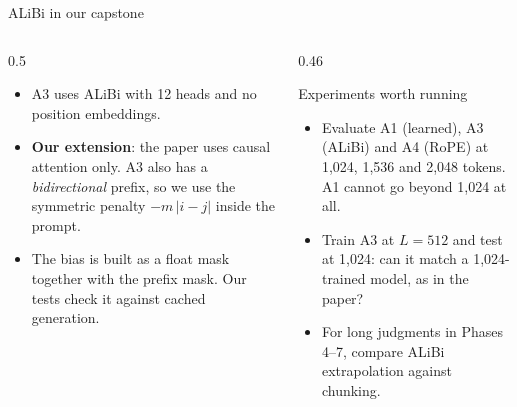 \documentclass[aspectratio=169,11pt]{beamer}
\begin{document}
\begin{frame}{ALiBi in our capstone}
  \begin{columns}[T]
    \begin{column}{0.5\textwidth}
      \small
      \begin{itemize}
        \item A3 uses ALiBi with 12 heads and no position embeddings.
        \item \textbf{Our extension}: the paper uses causal attention only. A3 also has a \emph{bidirectional} prefix, so we use the symmetric penalty $-m\,|i-j|$ inside the prompt.
        \item The bias is built as a float mask together with the prefix mask. Our tests check it against cached generation.
      \end{itemize}
    \end{column}
    \begin{column}{0.46\textwidth}
      \begin{block}{Experiments worth running}
        \small
        \begin{itemize}
          \item Evaluate A1 (learned), A3 (ALiBi) and A4 (RoPE) at 1,024, 1,536 and 2,048 tokens. A1 cannot go beyond 1,024 at all.
          \item Train A3 at $L=512$ and test at 1,024: can it match a 1,024-trained model, as in the paper?
          \item For long judgments in Phases 4--7, compare ALiBi extrapolation against chunking.
        \end{itemize}
      \end{block}
    \end{column}
  \end{columns}
\end{frame}
\end{document}
